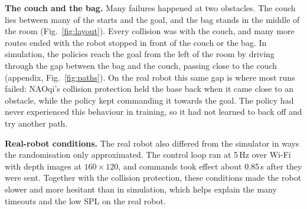\textbf{The couch and the bag.} Many failures happened at two obstacles. The couch lies between many
of the starts and the goal, and the bag stands in the middle of the room (Fig.~\ref{fig:layout}).
Every collision was with the couch, and many more routes ended with the robot stopped in front of
the couch or the bag. In simulation, the policies reach the goal from the left of the room by
driving through the gap between the bag and the couch, passing close to the couch (appendix,
Fig.~\ref{fig:paths}). On the real robot this same gap is where most runs failed: NAOqi's collision
protection held the base back when it came close to an obstacle, while the policy kept commanding it
towards the goal. The policy had never experienced this behaviour in training, so it had not learned
to back off and try another path.

\textbf{Real-robot conditions.} The real robot also differed from the simulator in ways the
randomisation only approximated. The control loop ran at 5\,Hz over Wi-Fi with depth images at
$160\times120$, and commands took effect about 0.85\,s after they were sent. Together with the collision protection, these
conditions made the robot slower and more hesitant than in simulation, which helps explain the
many timeouts and the low SPL on the real robot.
